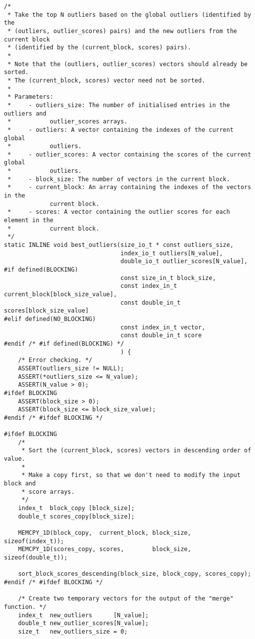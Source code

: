 \begin{lstlisting}
/*
 * Take the top N outliers based on the global outliers (identified by the
 * (outliers, outlier_scores) pairs) and the new outliers from the current block
 * (identified by the (current_block, scores) pairs).
 *
 * Note that the (outliers, outlier_scores) vectors should already be sorted.
 * The (current_block, scores) vector need not be sorted.
 *
 * Parameters:
 *     - outliers_size: The number of initialised entries in the outliers and
 *           outlier_scores arrays.
 *     - outliers: A vector containing the indexes of the current global
 *           outliers.
 *     - outlier_scores: A vector containing the scores of the current global
 *           outliers.
 *     - block_size: The number of vectors in the current block.
 *     - current_block: An array containing the indexes of the vectors in the
             current block.
 *     - scores: A vector containing the outlier scores for each element in the
 *           current block.
 */
static INLINE void best_outliers(size_io_t * const outliers_size,
                                 index_io_t outliers[N_value],
                                 double_io_t outlier_scores[N_value],
#if defined(BLOCKING)
                                 const size_in_t block_size,
                                 const index_in_t current_block[block_size_value],
                                 const double_in_t scores[block_size_value]
#elif defined(NO_BLOCKING)
                                 const index_in_t vector,
                                 const double_in_t score
#endif /* #if defined(BLOCKING) */
                                 ) {
    /* Error checking. */
    ASSERT(outliers_size != NULL);
    ASSERT(*outliers_size <= N_value);
    ASSERT(N_value > 0);
#ifdef BLOCKING
    ASSERT(block_size > 0);
    ASSERT(block_size <= block_size_value);
#endif /* #ifdef BLOCKING */
    
#ifdef BLOCKING
    /* 
     * Sort the (current_block, scores) vectors in descending order of value.
     *
     * Make a copy first, so that we don't need to modify the input block and 
     * score arrays.
     */
    index_t  block_copy [block_size];
    double_t scores_copy[block_size];
    
    MEMCPY_1D(block_copy,  current_block, block_size, sizeof(index_t));
    MEMCPY_1D(scores_copy, scores,        block_size, sizeof(double_t));
    
    sort_block_scores_descending(block_size, block_copy, scores_copy);
#endif /* #ifdef BLOCKING */
    
    /* Create two temporary vectors for the output of the "merge" function. */
    index_t  new_outliers      [N_value];
    double_t new_outlier_scores[N_value];
    size_t   new_outliers_size = 0;
    

\end{lstlisting}
